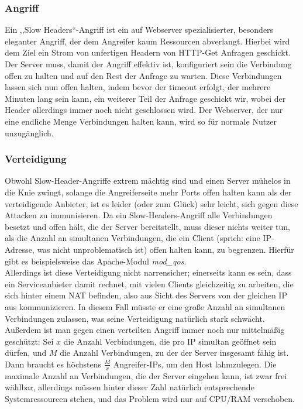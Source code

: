 \documentclass[12pt,a4paper]{article}
\begin{document}
\subsubsection*{Angriff}
Ein ,,Slow Headers``-Angriff ist ein auf Webserver spezialisierter, besonders eleganter Angriff, der dem Angreifer kaum Ressourcen abverlangt. Hierbei wird dem Ziel ein Strom von unfertigen Headern von HTTP-Get Anfragen geschickt. Der Server muss, damit der Angriff effektiv ist, konfiguriert sein die Verbindung offen zu halten und auf den Rest der Anfrage zu warten. Diese Verbindungen lassen sich nun offen halten, indem bevor der timeout erfolgt, der mehrere Minuten lang sein kann, ein weiterer Teil der Anfrage geschickt wir, wobei der Header allerdings immer noch nicht geschlossen wird. Der Webserver, der nur eine endliche Menge Verbindungen halten kann, wird so für normale Nutzer unzugänglich.
\subsubsection*{Verteidigung}
Obwohl Slow-Header-Angriffe extrem mächtig sind und einen Server mühelos in die Knie zwingt, solange die Angreiferseite mehr Ports offen halten kann als der verteidigende Anbieter, ist es leider (oder zum Glück) sehr leicht, sich gegen diese Attacken zu immunisieren. Da ein Slow-Headers-Angriff alle Verbindungen besetzt und offen hält, die der Server bereitstellt, muss dieser nichts weiter tun, als die Anzahl an simultanen Verbindungen, die ein Client (sprich: eine IP-Adresse, was nicht unproblematisch ist) offen halten kann, zu begrenzen. Hierfür gibt es beispielsweise das Apache-Modul \textit{mod\_qos}.\\
Allerdings ist diese Verteidigung nicht narrensicher; einerseits kann es sein, dass ein Serviceanbieter damit rechnet, mit vielen Clients gleichzeitig zu arbeiten, die sich hinter einem NAT befinden, also aus Sicht des Servers von der gleichen IP aus kommunizieren. In diesem Fall müsste er eine große Anzahl an simultanen Verbindungen zulassen, was seine Verteidigung natürlich stark schwächt. Außerdem ist man gegen einen verteilten Angriff immer noch nur mittelmäßig geschützt: Sei $x$ die Anzahl Verbindungen, die pro IP simultan geöffnet sein dürfen, und $M$ die Anzahl Verbindungen, zu der der Server insgesamt fähig ist. Dann braucht es höchstens $\frac{M}{x}$ Angreifer-IPs, um den Host lahmzulegen. Die maximale Anzahl an Verbindungen, die der Server eingehen kann, ist zwar frei wählbar, allerdings müssen hinter dieser Zahl natürlich entsprechende Systemressourcen stehen, und das Problem wird nur auf CPU/RAM verschoben.
\end{document}
